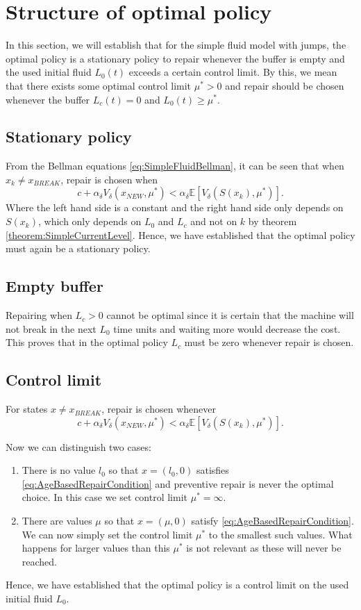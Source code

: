 \section{Structure of optimal policy}
In this section, we will establish that for the simple fluid model with jumps, the optimal policy is a stationary policy to repair whenever the buffer is empty and the used initial fluid $L_0(t)$ exceeds a certain control limit.
By this, we mean that there exists some optimal control limit $\mu^*>0$ and repair should be chosen whenever the buffer $L_c(t)=0$ and $L_0(t)\geq\mu^*$.

\subsection{Stationary policy}
From the Bellman equations \eqref{eq:SimpleFluidBellman}, it can be seen that when $x_k\neq x_{BREAK}$, repair is chosen when
\[ c+\alpha_\delta V_\delta(x_{NEW},\mu^*) <\alpha_\delta \mathbb{E}[V_\delta(S(x_k),\mu^*)]. \]
Where the left hand side is a constant and the right hand side only depends on $S(x_k)$, which only depends on $L_0$ and $L_c$ and not on $k$ by theorem \ref{theorem:SimpleCurrentLevel}.
Hence, we have established that the optimal policy must again be a stationary policy.

\subsection{Empty buffer}
Repairing when $L_c>0$ cannot be optimal since it is certain that the machine will not break in the next $L_0$ time units and waiting more would decrease the cost.
This proves that in the optimal policy $L_c$ must be zero whenever repair is chosen.

\subsection{Control limit}
For states $x\neq x_{BREAK}$, repair is chosen whenever
\begin{equation}\label{eq:SimpleFluidRepairCondition}
c+\alpha_\delta V_\delta(x_{NEW},\mu^*) <\alpha_\delta \mathbb{E}[V_\delta(S(x_k),\mu^*)].
\end{equation}

Now we can distinguish two cases:
\begin{enumerate}
	\item There is no value $l_0$ so that $x=(l_0,0)$ satisfies \eqref{eq:AgeBasedRepairCondition} and preventive repair is never the optimal choice.
	In this case we set control limit $\mu^*=\infty$.
	\item There are values $\mu$ so that $x=(\mu,0)$ satisfy \eqref{eq:AgeBasedRepairCondition}.
	We can now simply set the control limit $\mu^*$ to the smallest such values.
	What happens for larger values than this $\mu^*$ is not relevant as these will never be reached.
\end{enumerate}
Hence, we have established that the optimal policy is a control limit on the used initial fluid $L_0$.